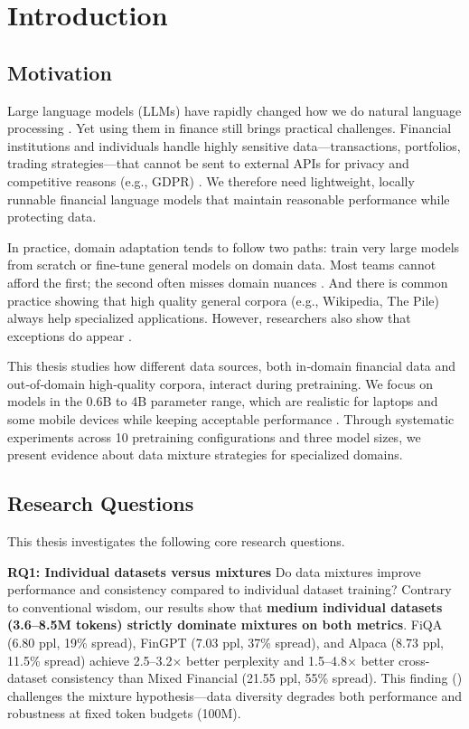 \chapter{Introduction}

\section{Motivation}

Large language models (LLMs) have rapidly changed how we do natural language processing \parencite{vaswani2017attention,radford2019language,brown2020language,touvron2023llama}. Yet using them in finance still brings practical challenges. Financial institutions and individuals handle highly sensitive data—transactions, portfolios, trading strategies—that cannot be sent to external APIs for privacy and competitive reasons (e.g., GDPR) \parencite{eu2016gdpr}. We therefore need lightweight, locally runnable financial language models that maintain reasonable performance while protecting data.

In practice, domain adaptation tends to follow two paths: train very large models from scratch or fine-tune general models on domain data. Most teams cannot afford the first; the second often misses domain nuances \parencite{gururangan2020don}. And there is common practice showing that high quality general corpora (e.g., Wikipedia, The Pile) always help specialized applications. However, researchers also show that exceptions do appear \parencite{gao2020pile,raffel2020exploring,longpre2023pretrainer}.

This thesis studies how different data sources, both in‑domain financial data and out‑of‑domain high‑quality corpora, interact during pretraining. We focus on models in the 0.6B to 4B parameter range, which are realistic for laptops and some mobile devices while keeping acceptable performance \parencite{yang2024qwen2,xia2023sheared,team2024gemma,javaheripi2023phi}. Through systematic experiments across 10 pretraining configurations and three model sizes, we present evidence about data mixture strategies for specialized domains.

\section{Research Questions}

This thesis investigates the following core research questions.

\textbf{RQ1: Individual datasets versus mixtures}
Do data mixtures improve performance and consistency compared to individual dataset training? Contrary to conventional wisdom, our results show that \textbf{medium individual datasets (3.6–8.5M tokens) strictly dominate mixtures on both metrics}. FiQA (6.80 ppl, 19\% spread), FinGPT (7.03 ppl, 37\% spread), and Alpaca (8.73 ppl, 11.5\% spread) achieve 2.5–3.2$\times$ better perplexity and 1.5–4.8$\times$ better cross-dataset consistency than Mixed Financial (21.55 ppl, 55\% spread). This finding () challenges the mixture hypothesis—data diversity degrades both performance and robustness at fixed token budgets (100M).

